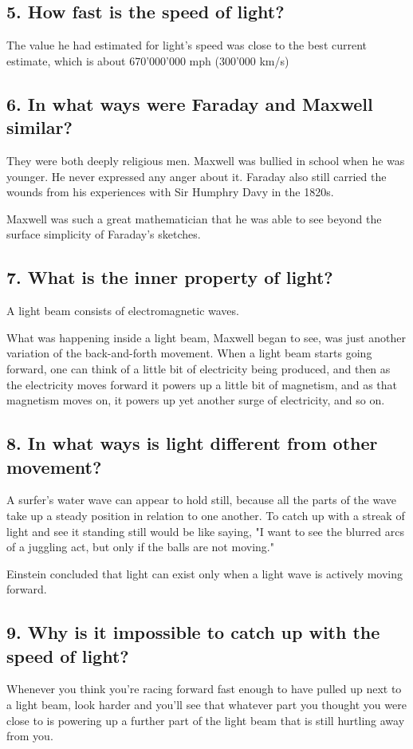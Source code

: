 \subsection*{5. How fast is the speed of light?}
The value he had estimated for light's speed was close to the best current estimate, which is about 670'000'000 mph (300'000 km/s)

\subsection*{6. In what ways were Faraday and Maxwell similar?}
They were both deeply religious men. Maxwell was bullied in school when he was younger. He never expressed any anger about it. Faraday also still carried the wounds from his experiences with Sir Humphry Davy in the 1820s.

Maxwell was such a great mathematician that he was able to see beyond the surface simplicity of Faraday's sketches.

\subsection*{7. What is the inner property of light?}
A light beam consists of electromagnetic waves.

What was happening inside a light beam, Maxwell began to see, was just another variation of the back-and-forth movement. When a light beam starts going forward, one can think of a little bit of electricity being produced, and then as the electricity moves forward it powers up a little bit of magnetism, and as that magnetism moves on, it powers up yet another surge of electricity, and so on.

\subsection*{8. In what ways is light different from other movement?}
A surfer's water wave can appear to hold still, because all the parts of the wave take up a steady position in relation to one another.
To catch up with a streak of light and see it standing still would be like saying, "I want to see the blurred arcs of a juggling act, but only if the balls are not moving."

Einstein concluded that light can exist only when a light wave is actively moving forward.

\subsection*{9. Why is it impossible to catch up with the speed of light?}
Whenever you think you're racing forward fast enough to have pulled up next to a light beam, look harder and you'll see that whatever part you thought you were close to is powering up a further part of the light beam that is still hurtling away from you.

